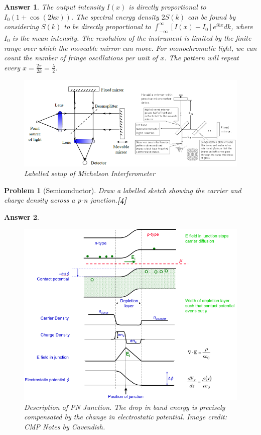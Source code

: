 \documentclass[a4paper]{article}
\newtheorem{ans}{Answer}[subsection]
\theoremstyle{new}
\newtheorem{qns}{Problem}[subsection]
\begin{document}
\begin{ans}
The output intensity $I(x)$ is directly proportional to $I_0(1+\cos(2kx))$. The spectral energy density $2S(k)$ can be found by considering $S(k)$ to be directly proportional to $\int_{-\infty}^\infty[I(x)-I_0]e^{ikx}dk$, where $I_0$ is the mean intensity. The resolution of the instrument is limited by the finite range over which the moveable mirror can move. For monochromatic light, we can count the number of fringe oscillations per unit of $x$. The pattern will repeat every $x=\frac{2\pi}{2k}=\frac{\lambda}{2}$.
\begin{figure}[H]
    \centering
    \includegraphics[width=\linewidth]{mmi.PNG}
    \caption{Labelled setup of Michelson Interferometer}
\end{figure}
\end{ans}
\begin{qns}[Semiconductor]
Draw a labelled sketch showing the carrier and charge density across a p-n junction.\hfill\textbf{[4]}
\end{qns}
\begin{ans}
\begin{figure}[H]
    \centering
    \includegraphics[width=\linewidth]{pnjunction.PNG}
    \caption{Description of PN Junction. The drop in band energy is precisely compensated by the change in electrostatic potential. Image credit: CMP Notes by Cavendish.}
\end{figure}
\end{ans}
\end{document}
